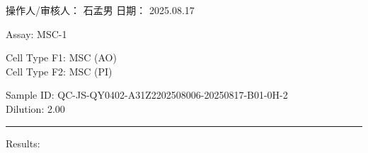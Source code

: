 \documentclass[UTF8,10pt,a4paper,fontset=fandol]{ctexart}
\newcommand{\fieldvalue}[1]{#1}
\newcommand{\handwritten}[1]{#1}
\begin{document}
\medskip

\begin{center}
\begin{minipage}[t]{0.43\linewidth}
\centering
{}
\end{minipage}
\hfill
\begin{minipage}[t]{0.43\linewidth}
\centering
{}
\end{minipage}

\vspace{0.5cm}

\begin{minipage}[t]{0.43\linewidth}
\centering
{}
\end{minipage}
\hfill
\begin{minipage}[t]{0.43\linewidth}
\centering
{}
\end{minipage}
\end{center}

\vfill

\noindent 操作人/审核人：%
\fieldvalue{\handwritten{石孟男}}
\hfill
日期：%
\fieldvalue{\handwritten{2025.08.17}}

\newpage

\noindent
Assay: MSC-1

\medskip

\noindent
Cell Type F1: MSC (AO)\\
Cell Type F2: MSC (PI)

\medskip

\noindent
Sample ID: QC-JS-QY0402-A31Z2202508006-20250817-B01-0H-2\\
Dilution: 2.00

\medskip
\hrule
\medskip

\noindent
Results:

\medskip
\end{document}
